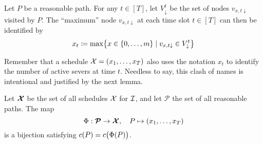 \begin{defn}
Let $P$ be a reasonable path. For any $t\in[T]$, let $V_\downarrow^t$ be the set of nodes $v_{x,t\downarrow}$ visited by $P$. The ``maximum'' node $v_{x,t\downarrow}$ at each time slot $t\in[T]$ can then be identified by
\begin{equation*}
	x_t\coloneqq\max\bigl\{x\in\{0,\ldots,m\}\mid v_{x,t\downarrow}\in V_\downarrow^t\bigr\}
\end{equation*}
\end{defn}
Remember that a schedule $\mathcal{X}=(x_1,\ldots,x_T)$ also uses the notation $x_t$ to identify the number of active severs at time $t$. Needless to say, this clash of names is intentional and justified by the next lemma.
\begin{lem}\label{lem:sched_reasn_path_pseudo_lin}
Let $\bm{\mathcal{X}}$ be the set of all schedules $\mathcal{X}$ for $\mathcal{I}$, and let $\bm{\mathcal{P}}$ the set of all reasonable paths. The map
\begin{equation*}\label{prop:reasn_paths_identify}
	\Phi:\bm{\mathcal{P}}\rightarrow\bm{\mathcal{X}},\quad P\mapsto (x_1,\ldots,x_T)
\end{equation*}
is a bijection satisfying $c(P)=c\bigl(\Phi(P)\bigr)$.
\end{lem}

